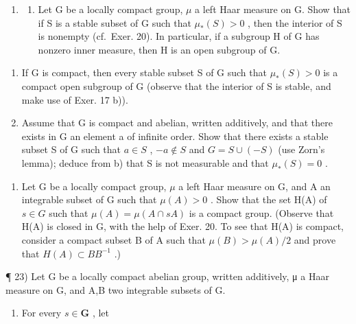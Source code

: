 \begin{enumerate}
\def\labelenumi{\arabic{enumi})}
\setcounter{enumi}{20}
\tightlist
\item
  \begin{enumerate}
  \def\labelenumii{\alph{enumii})}
  \tightlist
  \item
    Let G be a locally compact group, \(\mu\) a left Haar measure on G. Show that if S is a stable subset of G such that \(\mu_{*}(S)>0\) , then the interior of S is nonempty (cf.~Exer. 20). In particular, if a subgroup H of G has nonzero inner measure, then H is an open subgroup of G.
  \end{enumerate}
\end{enumerate}

\begin{enumerate}
\def\labelenumi{\alph{enumi})}
\setcounter{enumi}{1}
\item
  If G is compact, then every stable subset S of G such that \(\mu_{*}(S) > 0\) is a compact open subgroup of G (observe that the interior of S is stable, and make use of Exer. 17 b)).
\item
  Assume that G is compact and abelian, written additively, and that there exists in G an element a of infinite order. Show that there exists a stable subset S of G such that \(a \in S\) , \(-a \notin S\) and \(G = S \cup (-S)\) (use Zorn's lemma); deduce from b) that S is not measurable and that \(\mu_{*}(S) = 0\) .
\end{enumerate}

\begin{enumerate}
\def\labelenumi{\arabic{enumi})}
\setcounter{enumi}{21}
\tightlist
\item
  Let G be a locally compact group, \(\mu\) a left Haar measure on G, and A an integrable subset of G such that \(\mu(A) > 0\) . Show that the set H(A) of \(s \in G\) such that \(\mu(A) = \mu(A \cap sA)\) is a compact group. (Observe that H(A) is closed in G, with the help of Exer. 20. To see that H(A) is compact, consider a compact subset B of A such that \(\mu(B) > \mu(A)/2\) and prove that \(H(A) \subset BB^{-1}\) .)
\end{enumerate}

¶ 23) Let G be a locally compact abelian group, written additively, μ a Haar measure on G, and A,B two integrable subsets of G.

\begin{enumerate}
\def\labelenumi{\alph{enumi})}
\tightlist
\item
  For every \(s \in \mathbf{G}\) , let
\end{enumerate}

